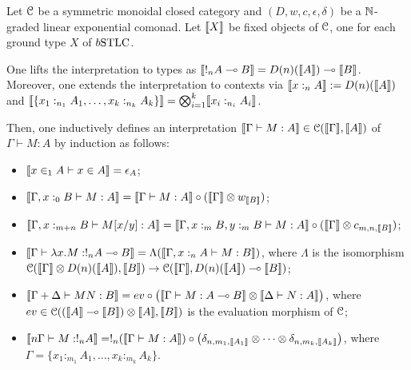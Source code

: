 \begin{definition}
Let $\mathcal{C}$ be a symmetric monoidal closed category and $(D, w,c,\epsilon,\delta)$ be a $\mathbb{N}$-graded linear exponential comonad. 
Let $\llbracket X\rrbracket$ be fixed objects of $\mathcal{C} $, one for each ground type $X$ of $\BSTLC$. 

One lifts the interpretation to types as 
$\llbracket!_{n}A\multimap B\rrbracket=D(n)(\llbracket A\rrbracket)\multimap \llbracket B\rrbracket$. Moreover, one extends the interpretation to contexts via $\llbracket x:_{n}A\rrbracket:= D(n)(\llbracket A\rrbracket)$ and 
$\llbracket\{x_{1}:_{n_{1}}A_{1},\dots, x_{k}:_{n_{k}}A_{k}\}\rrbracket=
\bigotimes_{i=1}^{k}\llbracket x_{i}:_{n_{i}}A_{i}\rrbracket$.

Then, one inductively defines an interpretation $\llbracket\Gamma \vdash M:A\rrbracket\in \mathcal{C}(\llbracket\Gamma\rrbracket, \llbracket A\rrbracket)$ of $\Gamma \vdash M:A$ by induction as follows:
 \begin{itemize}
\item $\llbracket x\in_{1}A\vdash x\in A\rrbracket=\epsilon_{A}$;
\item $\llbracket\Gamma,x:_{0}B\vdash M:A\rrbracket =
\llbracket\Gamma \vdash M:A\rrbracket
\circ (\llbracket\Gamma\rrbracket\otimes  w_{\llbracket B\rrbracket})
$;
\item $\llbracket\Gamma, x:_{m+n}B \vdash M[x/y]:A\rrbracket=
\llbracket\Gamma, x:_{m}B, y:_{m}B \vdash M:A\rrbracket
\circ
(\llbracket\Gamma\rrbracket \otimes c_{m,n,\llbracket B\rrbracket})
$;
\item $\llbracket\Gamma \vdash \lambda x.M: !_{n}A\multimap B\rrbracket=
\Lambda (\llbracket\Gamma, x:_{n}A \vdash M:B\rrbracket)
$, where $\Lambda$ is the isomorphism $ \mathcal{C}(\llbracket\Gamma\rrbracket \otimes D(n)(\llbracket A\rrbracket), \llbracket B\rrbracket) \to \mathcal{C}(\llbracket\Gamma\rrbracket, D(n)(\llbracket A\rrbracket)\multimap \llbracket B\rrbracket)$;

\item $\model{\Gamma+\Delta \vdash MN:B}=
\mathsf{ev}\circ \big( \model{\Gamma \vdash M:A\multimap B}
\otimes
\model{\Delta \vdash N:A}\big)$, where $\mathsf{ev}\in \C C((\model{A}\multimap \model B)\otimes \model A, \model B)$ is the evaluation morphism of $\mathcal{C}$;


\item $\llbracket n\Gamma\vdash M:!_{n}A\rrbracket=
 !_{n}(\llbracket\Gamma \vdash M:A\rrbracket)\circ \big(\delta_{n,m_{1},\llbracket A_{1}\rrbracket}\otimes \dots \otimes 
\delta_{n,m_{k},\llbracket A_{k}\rrbracket}\big)
$, where $\Gamma=\{x_{1}:_{m_{1}}A_{1},\dots, x_{k}:_{m_{k}}A_{k}\}$.

\end{itemize}
\end{definition}


